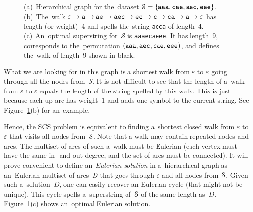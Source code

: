\begin{figure}[!ht]
\begin{mypic}


\end{mypic}
\caption{(a)~Hierarchical graph for the~dataset $\mathcal{S}=\{{\tt aaa}, {\tt cae}, {\tt aec}, {\tt eee}\}$. (b)~The~walk $\varepsilon \to {\tt a} \to {\tt ae} \to {\tt aec} \to {\tt ec} \to {\tt c} \to {\tt ca} \to {\tt a} \to \varepsilon$ has length (or weight)~4 and spells the~string {\tt aeca} of length~4. (c)~An~optimal superstring for~$\mathcal{S}$ is {\tt aaaecaeee}. It has length~9, corresponds to the~permutation $({\tt aaa}, {\tt aec}, {\tt cae}, {\tt eee})$, and defines the~walk of length~9 shown in black.}
\label{fig:hgex}
\end{figure}

What we are looking for in this graph is a shortest
walk from $\varepsilon$ to $\varepsilon$ going
through all the nodes from~$\mathcal{S}$.
It is not difficult to see that the length of a~walk 
from $\varepsilon$ to $\varepsilon$ equals the 
length of the string spelled by this walk. 
This is just because each up-arc has 
weight~$1$ and adds one symbol to 
the current string. See Figure~\ref{fig:hgex}(b) for an~example.

Hence, the SCS problem is equivalent to finding a~shortest closed walk from $\varepsilon$ to $\varepsilon$ that visits all nodes from~${\cal S}$. Note that a walk may contain repeated nodes and arcs. The multiset of arcs of such a~walk must be Eulerian (each vertex must have the same in- and out-degree, and the set of arcs must be connected). It will prove convenient to define an~{\em Eulerian solution} in a~hierarchical graph as an~Eulerian multiset of arcs~$D$ that goes through $\varepsilon$ and all nodes from~${\cal S}$. Given such a~solution~$D$, one can easily recover an Eulerian cycle (that might not be unique). This cycle spells a~superstring of~${\cal S}$ of the same length as~$D$. Figure~\ref{fig:hgex}(c) shows an~optimal Eulerian solution.

